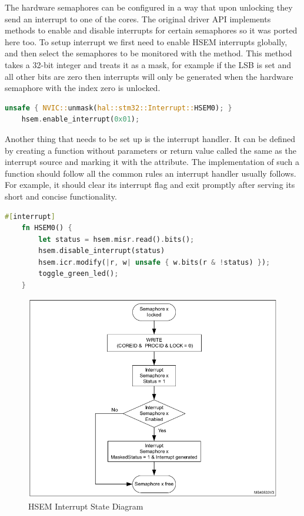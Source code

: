 The hardware semaphores can be configured in a way that upon unlocking they send an interrupt to one of the cores. The original driver API implements methods to enable and disable interrupts for certain semaphores so it was ported here too. To setup interrupt we first need to enable HSEM interrupts globally, and then select the semaphores to be monitored with the  method. This method takes a 32-bit integer and treats it as a mask, for example if the LSB is set and all other bits are zero then interrupts will only be generated when the hardware semaphore with the index zero is unlocked.

\begin{lstlisting}[language=Rust,frame=single,float=!ht,style=customrust,label={lst:interrupt-hsem-conf},caption={Enabling a HSEM Interrupt}]
    unsafe { NVIC::unmask(hal::stm32::Interrupt::HSEM0); }
    hsem.enable_interrupt(0x01);
\end{lstlisting}

Another thing that needs to be set up is the interrupt handler. It can be defined by creating a function without parameters or return value called the same as the interrupt source and marking it with the \mycode{#[interrupt]} attribute. The implementation of such a function should follow all the common rules an interrupt handler usually follows. For example, it should clear its interrupt flag and exit promptly after serving its short and concise functionality.

\begin{lstlisting}[language=Rust,frame=single,float=!ht,style=customrust,label={lst:interrupt-hsem-ex},caption={An Example HSEM Interrupt Handler}]
    #[interrupt]
    fn HSEM0() {
        let status = hsem.misr.read().bits();
        hsem.disable_interrupt(status)
        hsem.icr.modify(|r, w| unsafe { w.bits(r & !status) });
        toggle_green_led();
    }
\end{lstlisting}

\begin{figure}[!ht]
    \centering
    \includegraphics[width=150mm, keepaspectratio]{figures/hsem-interrupt.png}
    \caption{HSEM Interrupt State Diagram\cite{HsemInterrupt}}
    \label{fig:hsem-interrupt-sd}
\end{figure}


